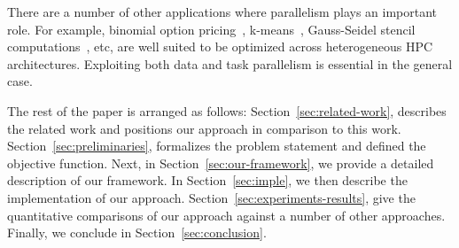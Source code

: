 There are a number of other applications where parallelism plays an
important
role. %
For example, binomial option pricing~\cite{ssol10,hpra10},
k-means~\cite{jzha11}, Gauss-Seidel stencil computations~\cite{hcou09},
etc, are well suited to be optimized across heterogeneous HPC
architectures. Exploiting both data and task parallelism is essential in
the general case.

The rest of the paper is arranged as follows:
Section~\ref{sec:related-work}, describes the related work and positions
our approach in comparison to this
work. Section~\ref{sec:preliminaries}, formalizes the problem
statement and defined the objective function. Next, in
Section~\ref{sec:our-framework}, we provide a detailed description of
our framework. In Section~\ref{sec:imple}, we then describe the
implementation of our approach. Section~\ref{sec:experiments-results},
give the quantitative comparisons of our approach against a number of
other approaches. Finally, we conclude in Section~\ref{sec:conclusion}.





